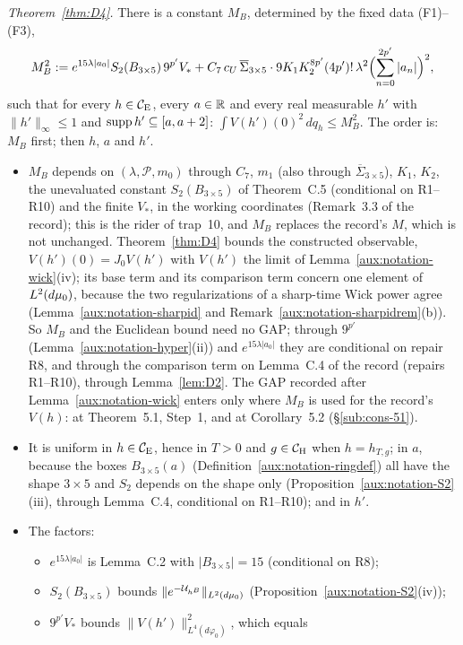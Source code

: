 \emph{Theorem~\ref{thm:D4}.} There is a constant $M_B$, determined by the fixed data
(F1)--(F3),
\[
 M_B^2:=e^{15\lambda|a_0|}S_2(B_{3\times5})\,9^{p'}V_*
 +C_7\,c_U\,\overline\Sigma_{3\times5}\cdot9K_1K_2^{8p'}(4p')!\,\lambda^2
 \Bigl(\sum_{n=0}^{2p'}|a_n|\Bigr)^2,
\]
such that for every $h\in\mathcal{C}_{\mathrm E}$, every $a\in\mathbb{R}$ and every real measurable $h'$ with
$\|h'\|_\infty\le1$ and $\operatorname{supp} h'\subseteq[a,a+2]$: $\int V(h')(0)^2\,dq_h\le M_B^2$. The order
is: $M_B$ first; then $h$, $a$ and $h'$.
\begin{itemize}
\item $M_B$ depends on $(\lambda,\mathscr P,m_0)$ through $C_7$, $m_1$ (also through
$\overline\Sigma_{3\times5}$), $K_1$, $K_2$, the unevaluated constant $S_2(B_{3\times5})$ of
Theorem~C.5 (conditional on R1--R10) and the finite $V_*$, in the working coordinates
(Remark~3.3 of the record); this is the rider of trap~10, and $M_B$ replaces the record's $M$,
which is not unchanged.  Theorem~\ref{thm:D4} bounds the constructed observable,
$V(h')(0)=J_0V(h')$ with $V(h')$ the limit of Lemma~\ref{aux:notation-wick}(iv); its base term
and its comparison term concern one element of $L^2(d\mu_0)$, because the two regularizations of a
sharp-time Wick power agree (Lemma~\ref{aux:notation-sharpid} and
Remark~\ref{aux:notation-sharpidrem}(b)).  So $M_B$ and the Euclidean bound need no GAP; through
$9^{p'}$ (Lemma~\ref{aux:notation-hyper}(ii)) and $e^{15\lambda|a_0|}$ they are conditional on
repair R8, and through the comparison term on Lemma~C.4 of the record (repairs R1--R10), through
Lemma~\ref{lem:D2}.  The GAP recorded after Lemma~\ref{aux:notation-wick} enters only where $M_B$ is used
for the record's $V(h)$: at Theorem~5.1, Step~1, and at Corollary~5.2 (\S\ref{sub:cons-51}).
\item It is uniform in $h\in\mathcal{C}_{\mathrm E}$, hence in $T>0$ and $g\in\mathcal{C}_{\mathrm H}$ when $h=h_{T,g}$; in $a$,
because the boxes $B_{3\times5}(a)$ (Definition~\ref{aux:notation-ringdef}) all have the shape
$3\times5$ and $S_2$ depends on the shape only (Proposition~\ref{aux:notation-S2}(iii), through
Lemma~C.4, conditional on R1--R10); and in $h'$.
\item The factors:
\begin{itemize}
\item $e^{15\lambda|a_0|}$ is Lemma~C.2 with $|B_{3\times5}|=15$ (conditional on R8);
\item $S_2(B_{3\times5})$ bounds $\|e^{-\mathcal U_{h^B}}\|_{L^2(d\mu_0)}$
(Proposition~\ref{aux:notation-S2}(iv));
\item $9^{p'}V_*$ bounds $\|V(h')\|_{L^4(d\varphi_0)}^2$, which equals

\end{itemize}
\end{itemize}
